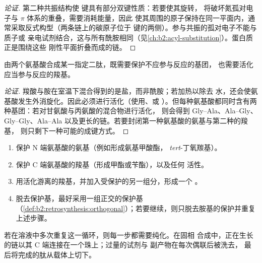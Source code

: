 \begin{proof}[论证]
第二种共振结构使  键具有部分双键性质：若要使其旋转，
将破坏氮孤对电子与  $\pi$ 体系的重叠，需要消耗能量，因此
使其周围的原子保持在同一平面内，通常采取反式构型（两条链上的碳原子位于
 键的两侧）。参与共振的孤对电子不能与质子或
亲电试剂结合，这与所有酰胺相同（见\cref{ch:b2:acyl-substitution}）。蛋白质正是围绕这些
刚性平面折叠而成的链。
\end{proof}

\begin{proposition}[为何要保护与活化]\label{prop:b2:biomolecules:coupling}
由两个氨基酸合成某一指定二肽，既需要保护不应参与反应的基团，
也需要活化应当参与反应的羧基。
\end{proposition}

\begin{proof}[论证]
羧酸与胺在室温下混合得到的是盐，而非酰胺；若加热以除去
水，还会使氨基酸发生外消旋化。因此必须进行活化（使用、或
）。但每种氨基酸都同时含有两种基团：若对甘氨酸与丙氨酸的混合物进行活化，
则会得到 Gly--Ala、Ala--Gly、Gly--Gly、Ala--Ala 以及更长的链。若要封闭第一种氨基酸的氨基与第二种的羧基，
则只剩下一种可能的成键方式。
\end{proof}

\begin{method}[二肽的合成]\label{met:b2:biomolecules:peptide}
\begin{enumerate}
  \item 保护 N 端氨基酸的氨基（例如形成氨基甲酸酯，
        \textit{tert}-丁氧羰基）。
  \item 保护 C 端氨基酸的羧基（形成甲酯或苄酯），以及任何
        活性。
  \item 用活化游离的羧基，并加入受保护的另一组分，形成一个
        。
  \item 脱去保护基，最好采用一组正交的保护基
        （\cref{def:b2:retrosynthesis:orthogonal}）；若要继续，则只脱去胺基的保护并重复上述步骤。
\end{enumerate}
\end{method}

若在溶液中多次重复这一循环，则每一步都需要纯化。在固相
合成中，正在生长的链以其 C 端连接在一个珠上；过量的试剂与
副产物在每次偶联后被洗去，
最后将完成的肽从载体上切下。

